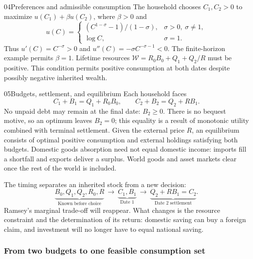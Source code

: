 \begin{modelsetup}[1]
\begin{modelcondition}{04}{Preferences and admissible consumption}
The household chooses $C_1,C_2>0$ to maximize $u(C_1)+\beta u(C_2)$, where
$\beta>0$ and
\[
 u(C)=\begin{cases}(C^{1-\sigma}-1)/(1-\sigma),&\sigma>0,\ \sigma\ne1,\\
 \log C,&\sigma=1.\end{cases}
\]
Thus $u'(C)=C^{-\sigma}>0$ and $u''(C)=-\sigma C^{-\sigma-1}<0$.
The finite-horizon example permits $\beta=1$. Lifetime resources
$\mathcal W=R_0B_0+Q_1+Q_2/R$ must be positive. This condition permits
positive consumption at both dates despite possibly negative inherited wealth.
\end{modelcondition}
\end{modelsetup}

\begin{modelsetup}[1]
\begin{modelcondition}{05}{Budgets, settlement, and equilibrium}
Each household faces
\[
 C_1+B_1=Q_1+R_0B_0,\qquad C_2+B_2=Q_2+RB_1.
\]
No unpaid debt may remain at the final date: $B_2\geq0$. There is no bequest
motive, so an optimum leaves $B_2=0$; this equality is a result of monotonic
utility combined with terminal settlement. Given the external price $R$,
an equilibrium consists of optimal positive consumption and external holdings
satisfying both budgets. Domestic goods absorption need not equal domestic
income: imports fill a shortfall and exports deliver a surplus. World goods
and asset markets clear once the rest of the world is included.
\end{modelcondition}
\end{modelsetup}

The timing separates an inherited stock from a new decision:
\begin{equation*}
 \underbrace{B_0,Q_1,Q_2,R_0,R}_{\text{Known before choice}}
 \ \longrightarrow\ 
 \underbrace{C_1,B_1}_{\text{Date 1}}
 \ \longrightarrow\ 
 \underbrace{Q_2+RB_1=C_2}_{\text{Date 2 settlement}}.
\end{equation*}
Ramsey's marginal trade-off will reappear. What changes is the resource
constraint and the determination of its return: domestic saving can buy a
foreign claim, and investment will no longer have to equal national saving.

\subsubsection{From two budgets to one feasible consumption set}

